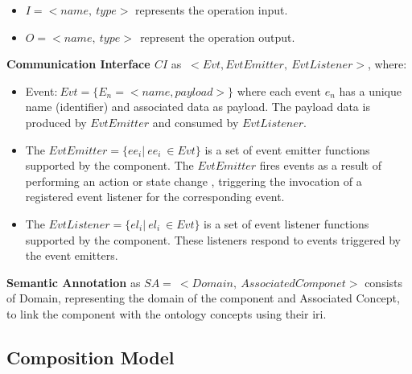 \begin{itemize}
\item
\(I = < name,\ type >\) represents the operation input.
\item
\(O = < name,\ type > \ \ \)represent the operation output.
\end{itemize}

\textbf{Communication Interface \(CI\)} as \( \ < Evt,EvtEmitter,\ EvtListener >\), where:
\begin{itemize}
\item
Event:\(\ Evt = \{ E_{n} = < name,payload > \}\) where each event
\(e_{n}\) has a unique name (identifier) and associated data as
  payload. The payload data is produced by \(EvtEmitter\) and consumed
  by \(EvtListener\).
\item
  The \(EvtEmitter = \{{ee}_{i}|\ {ee}_{i}\  \in Evt\}\) is a set of
  event emitter functions supported by the component. The \(EvtEmitter\)
  fires events as a result of performing an action or state change ,
  triggering the invocation of a registered event listener for the
  corresponding event.
\item
  The \(EvtListener = \{{el}_{i}|\ {el}_{i}\  \in Evt\}\) is a set of
  event listener functions supported by the component. These listeners
  respond to events triggered by the event emitters.
\end{itemize}

\textbf{Semantic Annotation} as \(SA = \  < Domain,\ AssociatedComponet >\) consists of Domain,
representing the domain of the component and Associated Concept, to link
the component with the ontology concepts using their \gls{iri}.

 
\vspace{-20pt}
\hypertarget{sec:Composition-model}{%
\subsection{Composition Model}\label{sec:Composition-model}}
\vspace{5pt}

